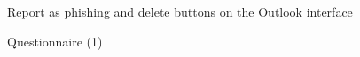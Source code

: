 \documentclass{l4proj}
\begin{document}
\begin{appendices}
\begin{figure}[H]
    \caption{Report as phishing and delete buttons on the Outlook interface}
    \label{fig:outlook_report}
\end{figure}

\begin{figure}[H]
    \caption{Questionnaire (1)}
    \label{fig:ques_1}
\end{figure}


\end{appendices}
\end{document}

